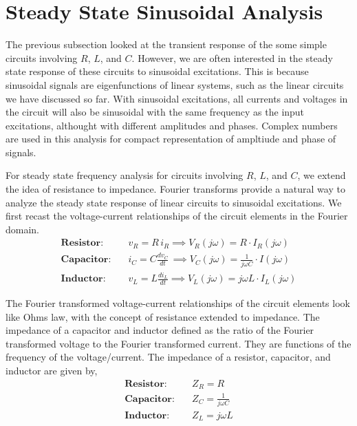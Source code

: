 \section{Steady State Sinusoidal Analysis}
The previous subsection looked at the transient response of the some simple circuits involving $R$, $L$, and $C$. However, we are often interested in the steady state response of these circuits to sinusoidal excitations. This is because sinusoidal signals are eigenfunctions of linear systems, such as the linear circuits we have discussed so far. With sinusoidal excitations, all currents and voltages in the circuit will also be sinusoidal with the same frequency as the input excitations, althought with different amplitudes and phases. Complex numbers are used in this analysis for compact representation of ampltiude and phase of signals. 

For steady state frequency analysis for circuits involving $R$, $L$, and $C$, we extend the idea of resistance to impedance. Fourier transforms provide a natural way to analyze the steady state response of linear circuits to sinusoidal excitations. We first recast the voltage-current relationships of the circuit elements in the Fourier domain. 
\begin{equation}
    \begin{split}
        \textbf{Resistor:} \quad & v_R = R \, i_R \implies V_R\left(j\omega\right) = R \cdot I_R\left(j\omega\right)\\
        \textbf{Capacitor:} \quad & i_C = C\frac{d v_C}{dt} \, \implies V_C\left(j\omega\right) = \frac{1}{j\omega C} \cdot I\left(j\omega\right)\\
        \textbf{Inductor:} \quad & v_L = L \frac{d i_L}{dt} \implies V_L\left(j\omega\right) = j\omega L \cdot I_L\left(j \omega \right)
    \end{split}
    \label{eq:02-34}
\end{equation}

The Fourier transformed voltage-current relationships of the circuit elements look like Ohms law, with the concept of resistance extended to impedance. The impedance of a capacitor and inductor defined as the ratio of the Fourier transformed voltage to the Fourier transformed current. They are functions of the frequency of the voltage/current. The impedance of a resistor, capacitor, and inductor are given by,
\begin{equation}
    \begin{split}
        \textbf{Resistor:} \quad & Z_R = R\\
        \textbf{Capacitor:} \quad & Z_C = \frac{1}{j\omega C}\\
        \textbf{Inductor:} \quad & Z_L = j\omega L
    \end{split}
    \label{eq:02-35}
\end{equation}

